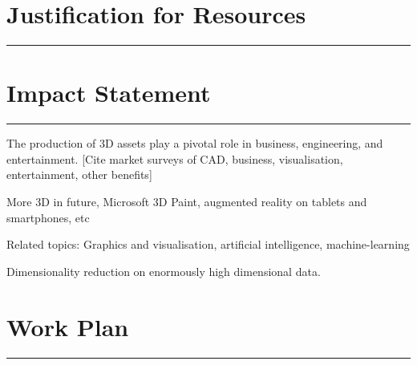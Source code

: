\documentclass[a4paper, fontsize=15pt, onecolumn]{article} %
\numberwithin{equation}{section} %
\numberwithin{figure}{section} %
\numberwithin{table}{section} %
\begin{document}
\newpage

\section*{Justification for Resources}
\hrule
\newpage

\section*{Impact Statement}
\hrule
The production of 3D assets play a pivotal role in business, engineering, and entertainment.
[Cite market surveys of CAD, business, visualisation, entertainment, other benefits]

More 3D in future, Microsoft 3D Paint, augmented reality on tablets and smartphones, etc

Related topics: Graphics and visualisation, artificial intelligence, machine-learning

Dimensionality reduction on enormously high dimensional data.

\newpage

\section*{Work Plan}
\hrule
\end{document}
